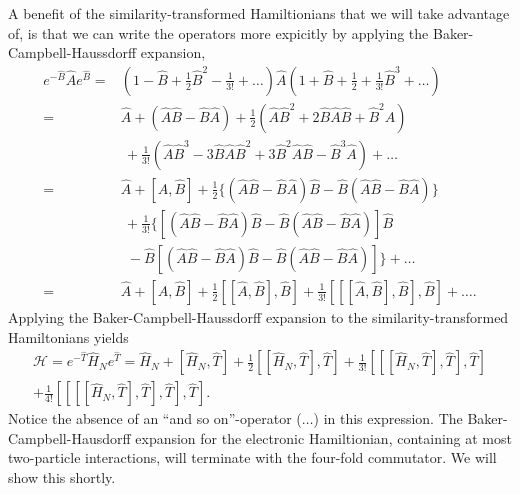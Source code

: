 A benefit of the similarity-transformed Hamiltionians that we will take advantage of,
is that we can write the operators
more expicitly by applying the Baker-Campbell-Haussdorff
expansion\cite{campbell1897law,baker1905alternants,hausdorff1906symbolische},
\begin{equation}
    \begin{aligned}
        e^{-\hat{B}}\hat{A}e^{\hat{B}}
        =& (1 - \hat{B} + \frac{1}{2}\hat{B}^2 - \frac{1}{3!} + \dots)
        \hat{A} (1 + \hat{B} + \frac{1}{2} + \frac{1}{3!}\hat{B}^3 + \dots) \\
        =& \hat{A} + (\hat{A}\hat{B} - \hat{B}\hat{A}) 
        + \frac{1}{2}(\hat{A}\hat{B}^2 + 2\hat{B}\hat{A}\hat{B} + \hat{B}^2\hat{A})
        \\ &\ + \frac{1}{3!}(
            \hat{A}\hat{B}^3 - 3\hat{B}\hat{A}\hat{B}^2 + 3\hat{B}^2\hat{A}\hat{B}
            - \hat{B}^3\hat{A}
        ) + \dots \\
        =& \hat{A} + [\hat{A}, \hat{B}] + 
        \frac{1}{2}\{
            (\hat{A}\hat{B} - \hat{B}\hat{A})\hat{B}
            -\hat{B}(\hat{A}\hat{B} - \hat{B}\hat{A})     
        \} \\ &\ + \frac{1}{3!} \{
            [(\hat{A}\hat{B} - \hat{B}\hat{A})\hat{B}
            -\hat{B}(\hat{A}\hat{B} - \hat{B}\hat{A})] \hat{B}\\
            &\ \ -\hat{B}[(\hat{A}\hat{B} - \hat{B}\hat{A})\hat{B}
            -\hat{B}(\hat{A}\hat{B} - \hat{B}\hat{A})]
        \} + \dots \\
        =& \hat{A} + [\hat{A}, \hat{B}]
        + \frac{1}{2}[[\hat{A}, \hat{B}], \hat{B}]
        + \frac{1}{3!} [[[\hat{A}, \hat{B}], \hat{B}], \hat{B}] + \dots .
    \end{aligned}
\end{equation}
Applying the Baker-Campbell-Haussdorff expansion to the similarity-transformed 
Hamiltonians yields
\begin{equation}
    \begin{gathered}
    \label{eq:bch_hamiltonian}
    \mathscr{H} = 
    e^{-\hat{T}}\hat{H}_Ne^{\hat{T}} = \hat{H}_N + [\hat{H}_N, \hat{T}]
        + \frac{1}{2}[[\hat{H}_N, \hat{T}], \hat{T}]
        + \frac{1}{3!}[[[\hat{H}_N, \hat{T}], \hat{T}], \hat{T}] \\
        + \frac{1}{4!}[[[[\hat{H}_N, \hat{T}], \hat{T}], \hat{T}], \hat{T}].
    \end{gathered}
\end{equation}
Notice the absence of an ``and so on''-operator ($\dots$) in this expression. The Baker-Campbell-Hausdorff expansion 
for the electronic Hamiltionian, containing at most two-particle interactions, will 
terminate with the four-fold commutator. We will show this shortly.

